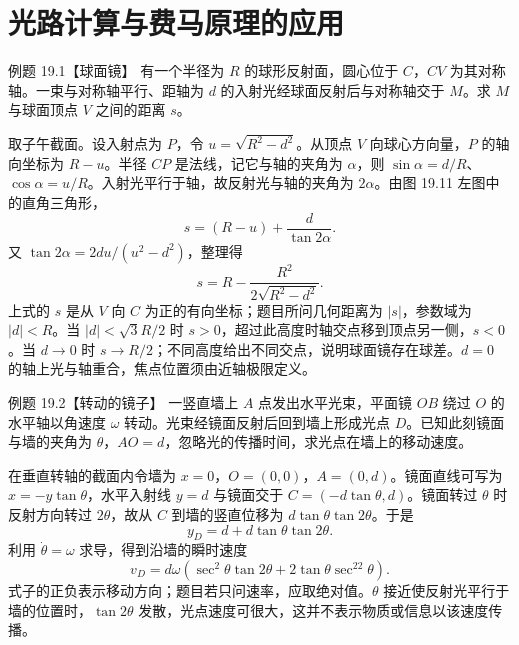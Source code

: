 \SphericalMirrorRotatingDiagram

\section{光路计算与费马原理的应用}

\begin{origexamplebox}{例题 19.1【球面镜】}
有一个半径为 $R$ 的球形反射面，圆心位于 $C$，$CV$ 为其对称轴。一束与对称轴平行、距轴为 $d$ 的入射光经球面反射后与对称轴交于 $M$。求 $M$ 与球面顶点 $V$ 之间的距离 $s$。
\end{origexamplebox}
\begin{xesolution}
取子午截面。设入射点为 $P$，令 $u=\sqrt{R^2-d^2}$。从顶点 $V$ 向球心方向量，$P$ 的轴向坐标为 $R-u$。半径 $CP$ 是法线，记它与轴的夹角为 $\alpha$，则 $\sin\alpha=d/R$、$\cos\alpha=u/R$。入射光平行于轴，故反射光与轴的夹角为 $2\alpha$。由图 19.11 左图中的直角三角形，
\[
 s=(R-u)+\frac{d}{\tan 2\alpha}.
\]
又 $\tan2\alpha=2du/(u^2-d^2)$，整理得
\[
 \boxed{s=R-\frac{R^2}{2\sqrt{R^2-d^2}}}.
\]
上式的 $s$ 是从 $V$ 向 $C$ 为正的有向坐标；题目所问几何距离为 $|s|$，参数域为 $|d|<R$。当 $|d|<\sqrt3R/2$ 时 $s>0$，超过此高度时轴交点移到顶点另一侧，$s<0$。当 $d\to0$ 时 $s\to R/2$；不同高度给出不同交点，说明球面镜存在球差。$d=0$ 的轴上光与轴重合，焦点位置须由近轴极限定义。
\end{xesolution}

\begin{origexamplebox}{例题 19.2【转动的镜子】}
一竖直墙上 $A$ 点发出水平光束，平面镜 $OB$ 绕过 $O$ 的水平轴以角速度 $\omega$ 转动。光束经镜面反射后回到墙上形成光点 $D$。已知此刻镜面与墙的夹角为 $\theta$，$AO=d$，忽略光的传播时间，求光点在墙上的移动速度。
\end{origexamplebox}
\begin{xesolution}
在垂直转轴的截面内令墙为 $x=0$，$O=(0,0)$，$A=(0,d)$。镜面直线可写为 $x=-y\tan\theta$，水平入射线 $y=d$ 与镜面交于 $C=(-d\tan\theta,d)$。镜面转过 $\theta$ 时反射方向转过 $2\theta$，故从 $C$ 到墙的竖直位移为 $d\tan\theta\tan2\theta$。于是
\[
 y_D=d+d\tan\theta\tan2\theta.
\]
利用 $\dot\theta=\omega$ 求导，得到沿墙的瞬时速度
\[
 \boxed{v_D=d\omega\!\left(\sec^2\theta\tan2\theta+2\tan\theta\sec^22\theta\right)}.
\]
式子的正负表示移动方向；题目若只问速率，应取绝对值。$\theta$ 接近使反射光平行于墙的位置时，$\tan2\theta$ 发散，光点速度可很大，这并不表示物质或信息以该速度传播。
\end{xesolution}

\CylinderDiagram

